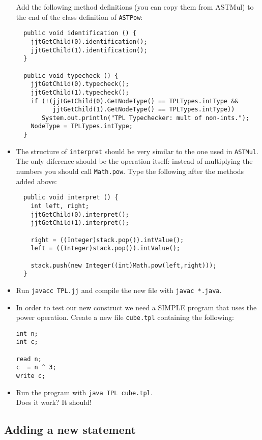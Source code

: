 \documentclass{article}
\begin{document}
\begin{itemize}
Add the following method definitions (you can copy them from ASTMul) to the end of the class definition of {\tt ASTPow}:

\begin{verbatim}
  public void identification () {
    jjtGetChild(0).identification();
    jjtGetChild(1).identification();
  }

  public void typecheck () {
    jjtGetChild(0).typecheck();
    jjtGetChild(1).typecheck();
    if (!(jjtGetChild(0).GetNodeType() == TPLTypes.intType &&
          jjtGetChild(1).GetNodeType() == TPLTypes.intType))
       System.out.println("TPL Typechecker: mult of non-ints.");
    NodeType = TPLTypes.intType;
  }
\end{verbatim}

\item The structure of {\tt interpret} should be very similar to the one used in {\tt ASTMul}. The only diference should be the operation itself: instead of multiplying the numbers you should call {\tt Math.pow}. Type the following after the methods added above:

\begin{verbatim}
  public void interpret () {
    int left, right;
    jjtGetChild(0).interpret();
    jjtGetChild(1).interpret();

    right = ((Integer)stack.pop()).intValue();
    left = ((Integer)stack.pop()).intValue();

    stack.push(new Integer((int)Math.pow(left,right)));
  }
\end{verbatim}

\item Run {\tt javacc TPL.jj} and compile the new file with {\tt javac *.java}.

\item In order to test our new construct we need a SIMPLE program that uses the power operation. Create a new file {\tt cube.tpl} containing the following:
\begin{verbatim}
int n;
int c;

read n;
c  = n ^ 3;
write c;
\end{verbatim}

\item Run the program with {\tt java TPL cube.tpl}.\\
Does it work? It should!

\end{itemize}

\subsection*{Adding a new statement}
\end{document}
